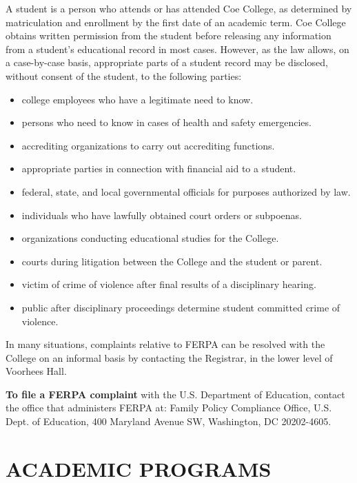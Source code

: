 \documentclass[
  letterpaper,
]{scrbook}
\providecommand{\tightlist}{%
  \setlength{\itemsep}{0pt}\setlength{\parskip}{0pt}}
\renewcommand{\part}[1]{\addcontentsline{toc}{part}{#1}}
\begin{document}
A student is a person who attends or has attended Coe College, as
determined by matriculation and enrollment by the first date of an
academic term. Coe College obtains written permission from the student
before releasing any information from a student's educational record in
most cases. However, as the law allows, on a case-by-case basis,
appropriate parts of a student record may be disclosed, without consent
of the student, to the following parties:

\begin{itemize}
\tightlist
\item
  college employees who have a legitimate need to know.
\item
  persons who need to know in cases of health and safety emergencies.
\item
  accrediting organizations to carry out accrediting functions.
\item
  appropriate parties in connection with financial aid to a student.
\item
  federal, state, and local governmental officials for purposes
  authorized by law.
\item
  individuals who have lawfully obtained court orders or subpoenas.
\item
  organizations conducting educational studies for the College.
\item
  courts during litigation between the College and the student or
  parent.
\item
  victim of crime of violence after final results of a disciplinary
  hearing.
\item
  public after disciplinary proceedings determine student committed
  crime of violence.
\end{itemize}

In many situations, complaints relative to FERPA can be resolved with
the College on an informal basis by contacting the Registrar, in the
lower level of Voorhees Hall.

\textbf{To file a FERPA complaint} with the U.S. Department of
Education, contact the office that administers FERPA at: Family Policy
Compliance Office, U.S. Dept. of Education, 400 Maryland Avenue SW,
Washington, DC 20202-4605.

\part{COURSES OF INSTRUCTION}

\hypertarget{academic-programs}{%
\chapter{ACADEMIC PROGRAMS}\label{academic-programs}}
\end{document}
